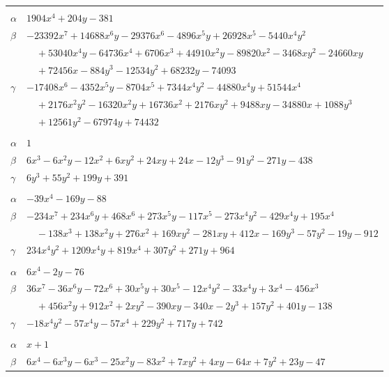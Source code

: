 \documentclass[11pt]{article}
\begin{document}
\begin{longtable}{@{}ll@{}}
\addlinespace[3pt]
\multicolumn{2}{@{}l}{$\{i,j\}=\{6,77\}$, $k_{ij}=3^{3}\cdot 11$}\\
$\alpha$ & $1904x^{4}+204y-381$\\
$\beta$ & $-23392x^{7}+14688x^{6}y-29376x^{6}-4896x^{5}y+26928x^{5}-5440x^{4}y^{2}$\\
 & $\quad +53040x^{4}y-64736x^{4}+6706x^{3}+44910x^{2}y-89820x^{2}-3468xy^{2}-24660xy$\\
 & $\quad +72456x-884y^{3}-12534y^{2}+68232y-74093$\\
$\gamma$ & $-17408x^{6}-4352x^{5}y-8704x^{5}+7344x^{4}y^{2}-44880x^{4}y+51544x^{4}$\\
 & $\quad +2176x^{2}y^{2}-16320x^{2}y+16736x^{2}+2176xy^{2}+9488xy-34880x+1088y^{3}$\\
 & $\quad +12561y^{2}-67974y+74432$\\
\addlinespace[3pt]
\multicolumn{2}{@{}l}{$\{i,j\}=\{7,15\}$, $k_{ij}=2\cdot 3^{5}$}\\
$\alpha$ & $1$\\
$\beta$ & $6x^{3}-6x^{2}y-12x^{2}+6xy^{2}+24xy+24x-12y^{3}-91y^{2}-271y-438$\\
$\gamma$ & $6y^{3}+55y^{2}+199y+391$\\
\addlinespace[3pt]
\multicolumn{2}{@{}l}{$\{i,j\}=\{7,20\}$, $k_{ij}=2^{2}\cdot 3^{3}\cdot 5^{2}$}\\
$\alpha$ & $-39x^{4}-169y-88$\\
$\beta$ & $-234x^{7}+234x^{6}y+468x^{6}+273x^{5}y-117x^{5}-273x^{4}y^{2}-429x^{4}y+195x^{4}$\\
 & $\quad -138x^{3}+138x^{2}y+276x^{2}+169xy^{2}-281xy+412x-169y^{3}-57y^{2}-19y-912$\\
$\gamma$ & $234x^{4}y^{2}+1209x^{4}y+819x^{4}+307y^{2}+271y+964$\\
\addlinespace[3pt]
\multicolumn{2}{@{}l}{$\{i,j\}=\{7,36\}$, $k_{ij}=2^{3}\cdot 5^{2}$}\\
$\alpha$ & $6x^{4}-2y-76$\\
$\beta$ & $36x^{7}-36x^{6}y-72x^{6}+30x^{5}y+30x^{5}-12x^{4}y^{2}-33x^{4}y+3x^{4}-456x^{3}$\\
 & $\quad +456x^{2}y+912x^{2}+2xy^{2}-390xy-340x-2y^{3}+157y^{2}+401y-138$\\
$\gamma$ & $-18x^{4}y^{2}-57x^{4}y-57x^{4}+229y^{2}+717y+742$\\
\addlinespace[3pt]
\multicolumn{2}{@{}l}{$\{i,j\}=\{7,44\}$, $k_{ij}=2\cdot 3^{3}$}\\
$\alpha$ & $x+1$\\
$\beta$ & $6x^{4}-6x^{3}y-6x^{3}-25x^{2}y-83x^{2}+7xy^{2}+4xy-64x+7y^{2}+23y-47$\\

\end{longtable}
\end{document}
